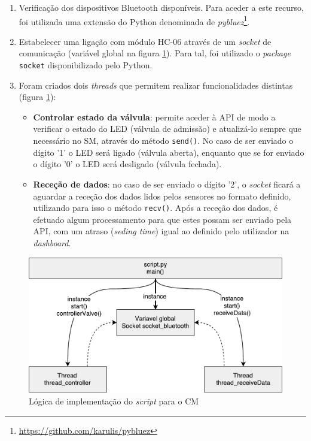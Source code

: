 \begin{enumerate}
	\item Verificação dos dispositivos Bluetooth disponíveis. Para aceder a este recurso, foi utilizada uma extensão do Python denominada de \textit{pybluez}\footnote{\url{https://github.com/karulis/pybluez}}. 
	
	
	\item Estabelecer uma ligação com módulo HC-06 através de um \textit{socket} de comunicação (variável global na figura \ref{threadscript}). Para tal, foi utilizado o \textit{package} \texttt{socket} disponibilizado pelo Python.
	
	\item Foram criados dois \textit{threads} que permitem realizar funcionalidades distintas (figura \ref{threadscript}): 
	
	\begin{itemize}
		\item \textbf{Controlar estado da válvula}: permite aceder à \ac{API} de modo a verificar o estado do \ac{LED}  (válvula de admissão) e atualizá-lo sempre que necessário no \acl{SM}, através do método \texttt{send()}. No caso de ser enviado o dígito '1' o \ac{LED} será ligado (válvula aberta), enquanto que se for enviado o dígito '0' o  \ac{LED} será desligado (válvula fechada). 
		
		\item \textbf{Receção de dados}: no caso de ser enviado o  dígito '2', o \textit{socket} ficará a aguardar a receção dos dados lidos pelos sensores no formato definido, utilizando para isso o método \texttt{recv()}. Após a receção dos dados, é efetuado algum processamento para que estes possam ser enviado pela \ac{API}, com um atraso (\textit{seding time}) igual ao definido pelo utilizador na \textit{dashboard}. 
		
		
	\end{itemize}
	
	

\end{enumerate}





\begin{figure}[h]
	\centering
	\includegraphics[width=0.67\linewidth]{esquemas/threads-python-script.pdf}
	\caption{Lógica de implementação do \textit{script} para o \acl{CM} }
	\label{threadscript}
\end{figure}










